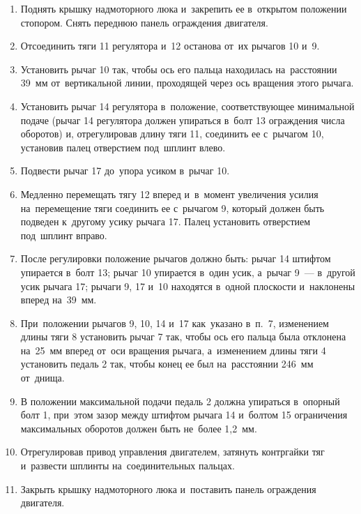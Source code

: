\begin{enumerate}
    \item Поднять крышку надмоторного люка и~закрепить ее в~открытом положении стопором. Снять переднюю панель ограждения двигателя. 
    \item Отсоединить тяги 11 регулятора и~12 останова от~их рычагов 10 и~9. 
    \item Установить рычаг 10 так, чтобы ось его пальца находилась на~расстоянии 39~мм от~вертикальной линии, проходящей через ось вращения этого рычага. 
    \item Установить рычаг 14 регулятора в~положение, соответствующее минимальной подаче (рычаг 14 регулятора должен упираться в~болт 13 ограждения числа оборотов) и, отрегулировав длину тяги 11, соединить ее с~рычагом 10, установив палец отверстием под~шплинт влево. 
    \item Подвести рычаг 17 до~упора усиком в~рычаг 10. 
    \item Медленно перемещать тягу 12 вперед и~в~момент увеличения усилия на~перемещение тяги соединить ее с~рычагом 9, который должен быть подведен к~другому усику рычага 17. Палец установить отверстием под~шплинт вправо. 
    \item После регулировки положение рычагов должно быть: рычаг 14 штифтом упирается в~болт 13; рычаг 10 упирается в~один усик, а~рычаг 9~--- в~другой усик рычага 17; рычаги 9, 17 и~10 находятся в~одной плоскости и~наклонены вперед на~39~мм. 
    

    \item При~положении рычагов 9, 10, 14 и~17 как~указано в~п.~7, изменением длины тяги 8 установить рычаг 7 так, чтобы ось его пальца была отклонена на~25~мм вперед от~оси вращения рычага, а~изменением длины тяги 4 установить педаль 2 так, чтобы конец ее был на~расстоянии 246~мм от~днища. 
    \item В положении максимальной подачи педаль 2 должна упираться в~опорный болт 1, при~этом зазор между штифтом рычага 14 и~болтом 15 ограничения максимальных оборотов должен быть не~более 1,2~мм. 
    \item Отрегулировав привод управления двигателем, затянуть контргайки тяг и~развести шплинты на~соединительных пальцах. 
    \item Закрыть крышку надмоторного люка и~поставить панель ограждения двигателя. 
\end{enumerate}



